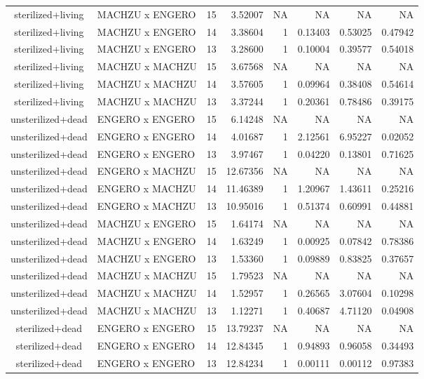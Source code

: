 \begin{table}[t]
\begin{tabular*}{\linewidth}{@{\extracolsep{\fill}}clrrrrrr}
sterilized+living & MACHZU x ENGERO & 15 & 3.52007 & NA & NA & NA & NA \\ 
sterilized+living & MACHZU x ENGERO & 14 & 3.38604 & 1 & 0.13403 & 0.53025 & 0.47942 \\ 
sterilized+living & MACHZU x ENGERO & 13 & 3.28600 & 1 & 0.10004 & 0.39577 & 0.54018 \\ 
sterilized+living & MACHZU x MACHZU & 15 & 3.67568 & NA & NA & NA & NA \\ 
sterilized+living & MACHZU x MACHZU & 14 & 3.57605 & 1 & 0.09964 & 0.38408 & 0.54614 \\ 
sterilized+living & MACHZU x MACHZU & 13 & 3.37244 & 1 & 0.20361 & 0.78486 & 0.39175 \\ 
unsterilized+dead & ENGERO x ENGERO & 15 & 6.14248 & NA & NA & NA & NA \\ 
unsterilized+dead & ENGERO x ENGERO & 14 & 4.01687 & 1 & 2.12561 & 6.95227 & 0.02052 \\ 
unsterilized+dead & ENGERO x ENGERO & 13 & 3.97467 & 1 & 0.04220 & 0.13801 & 0.71625 \\ 
unsterilized+dead & ENGERO x MACHZU & 15 & 12.67356 & NA & NA & NA & NA \\ 
unsterilized+dead & ENGERO x MACHZU & 14 & 11.46389 & 1 & 1.20967 & 1.43611 & 0.25216 \\ 
unsterilized+dead & ENGERO x MACHZU & 13 & 10.95016 & 1 & 0.51374 & 0.60991 & 0.44881 \\ 
unsterilized+dead & MACHZU x ENGERO & 15 & 1.64174 & NA & NA & NA & NA \\ 
unsterilized+dead & MACHZU x ENGERO & 14 & 1.63249 & 1 & 0.00925 & 0.07842 & 0.78386 \\ 
unsterilized+dead & MACHZU x ENGERO & 13 & 1.53360 & 1 & 0.09889 & 0.83825 & 0.37657 \\ 
unsterilized+dead & MACHZU x MACHZU & 15 & 1.79523 & NA & NA & NA & NA \\ 
unsterilized+dead & MACHZU x MACHZU & 14 & 1.52957 & 1 & 0.26565 & 3.07604 & 0.10298 \\ 
unsterilized+dead & MACHZU x MACHZU & 13 & 1.12271 & 1 & 0.40687 & 4.71120 & 0.04908 \\ 
sterilized+dead & ENGERO x ENGERO & 15 & 13.79237 & NA & NA & NA & NA \\ 
sterilized+dead & ENGERO x ENGERO & 14 & 12.84345 & 1 & 0.94893 & 0.96058 & 0.34493 \\ 
sterilized+dead & ENGERO x ENGERO & 13 & 12.84234 & 1 & 0.00111 & 0.00112 & 0.97383 \\ 

\end{tabular*}
\end{table}
